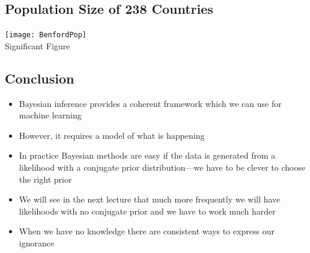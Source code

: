 
\begin{slide}
\section[-2]{Population Size of 238 Countries}

\begin{center}
  \texttt{[image: BenfordPop]}\\
  Significant Figure
\end{center}
\end{slide}


\begin{slide}
\section[-1]{Conclusion}

\begin{PauseHighLight}
  \begin{itemize}
  \item Bayesian inference provides a coherent framework which we can
    use for machine learning\pause
  \item However, it requires a model of what is happening\pause
  \item In practice Bayesian methods are easy if the data is generated
    from a likelihood with a conjugate prior distribution---we have to
    be clever to choose the right prior\pause
  \item We will see in the next lecture that much more frequently we
    will have likelihoods with no conjugate prior and we have to work
    much harder\pause
  \item When we have no knowledge there are consistent ways to express
    our ignorance\pause
  \end{itemize}
\end{PauseHighLight}

\end{slide}


